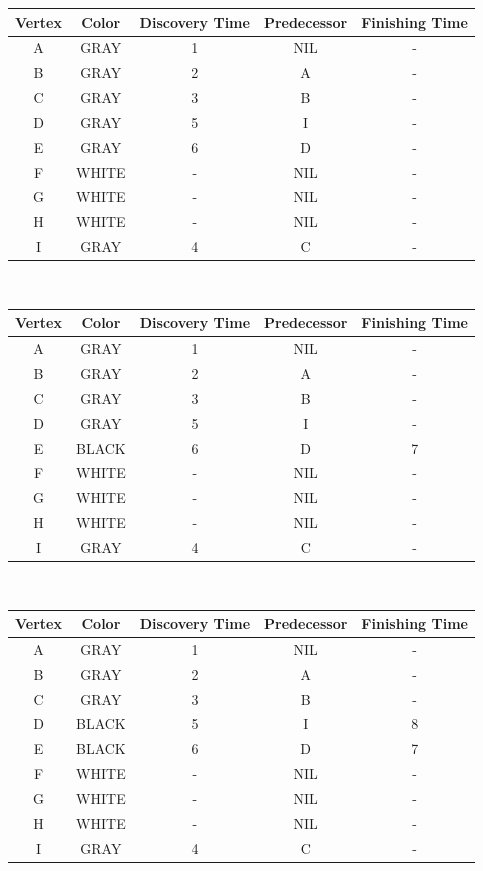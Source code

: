 \documentclass[12pt]{article}
\theoremstyle{plain}
\newcommand{\vs}{\vspace{2mm}}
\begin{document}
\begin{tabular}{|c|c|c|c|c|}
    \hline
    Vertex & Color & Discovery Time & Predecessor & Finishing Time \\ \hline
    A & GRAY & 1 & NIL & - \\ \hline
    B & GRAY & 2 & A & - \\ \hline
    C & GRAY & 3 & B & - \\ \hline
    D & GRAY & 5 & I & - \\ \hline
    E & GRAY & 6 & D & - \\ \hline
    F & WHITE & - & NIL & - \\ \hline
    G & WHITE & - & NIL & - \\ \hline
    H & WHITE & - & NIL & - \\ \hline
    I & GRAY & 4 & C & - \\ \hline
\end{tabular}
\vs\

\begin{tabular}{|c|c|c|c|c|}
    \hline
    Vertex & Color & Discovery Time & Predecessor & Finishing Time \\ \hline
    A & GRAY & 1 & NIL & - \\ \hline
    B & GRAY & 2 & A & - \\ \hline
    C & GRAY & 3 & B & - \\ \hline
    D & GRAY & 5 & I & - \\ \hline
    E & BLACK & 6 & D & 7 \\ \hline
    F & WHITE & - & NIL & - \\ \hline
    G & WHITE & - & NIL & - \\ \hline
    H & WHITE & - & NIL & - \\ \hline
    I & GRAY & 4 & C & - \\ \hline
\end{tabular}
\vs\

\begin{tabular}{|c|c|c|c|c|}
    \hline
    Vertex & Color & Discovery Time & Predecessor & Finishing Time \\ \hline
    A & GRAY & 1 & NIL & - \\ \hline
    B & GRAY & 2 & A & - \\ \hline
    C & GRAY & 3 & B & - \\ \hline
    D & BLACK & 5 & I & 8 \\ \hline
    E & BLACK & 6 & D & 7 \\ \hline
    F & WHITE & - & NIL & - \\ \hline
    G & WHITE & - & NIL & - \\ \hline
    H & WHITE & - & NIL & - \\ \hline
    I & GRAY & 4 & C & - \\ \hline
\end{tabular}
\vs\
\end{document}
